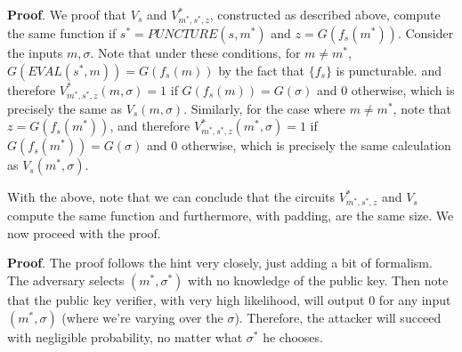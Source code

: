\documentclass{article}
\begin{document}
\begin{enumerate}
\begin{enumerate}[,label=\alph*.]
\begin{mdbmarginx}{1ex}{0pt}{1ex}{0pt}%
\noindent{}\textbf{Proof}.  We proof that $V_s$ and $V_{m^*,s^*,z}^*$, constructed as described above, compute the same function
if $s^* = PUNCTURE(s,m^*)$ and $z =G(f_s(m^*))$. Consider the inputs $m,\sigma$. 
Note that under these conditions, for $m \neq m^*$, $G(EVAL(s^*,m)) = G(f_s(m))$
by the fact that $\{f_s\}$ is puncturable. 
and therefore
$V_{m^*,s^*,z}^*(m,\sigma) = 1$ if $G(f_s(m)) = G(\sigma)$ and $0$ otherwise, which is precisely
the same as $V_s(m,\sigma)$. Similarly, for the case where $m \neq m^*$, note that $z = G(f_s(m^*))$,
and therefore $V_{m^*,s^*,z}^*(m^*,\sigma) = 1$ if $G(f_s(m^*)) = G(\sigma)$ and $0$ otherwise, which is precisely the
same calculation as $V_s(m^*,\sigma)$.%
\end{mdbmarginx}%

With the above, note that we can conclude that the circuits $V_{m^*,s^*,z}^*$ and $V_s$ compute the
same function and furthermore, with padding, are the same size. We now proceed with the proof.%

\begin{mdbmarginx}{1ex}{0pt}{1ex}{0pt}%
\noindent{}\textbf{Proof}.  The proof follows the hint very closely, just adding a bit of formalism. The adversary selects
$(m^*, \sigma^*)$ with no knowledge of the public key. Then note that the public key verifier,
with very high likelihood, will output $0$ for any input $(m^*,\sigma)$ (where we're varying over
the $\sigma$). Therefore, the attacker will succeed with negligible probability, no matter what $\sigma^*$
he chooses.%


\end{mdbmarginx}
\end{enumerate}
\end{enumerate}
\end{document}

